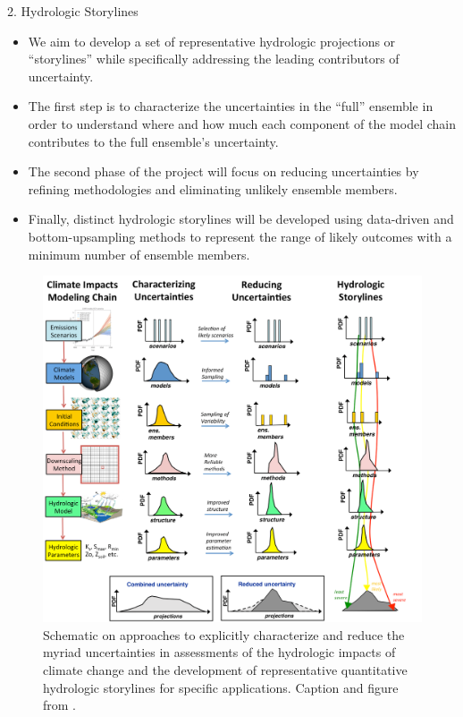 \documentclass{beamer}
\begin{document}
\begin{frame}{}
\begin{columns}
\begin{column}{.3333\paperwidth}
\begin{textblock}{\textwidth \TPHorizModule}
\begin{block}{2. Hydrologic Storylines}
\begin{itemize}
      \item We aim to develop a set of representative hydrologic projections or ``storylines'' while specifically addressing the leading contributors of uncertainty.
      \item The first step is to characterize the uncertainties in the ``full'' ensemble in order to understand where and how much each component of the model chain contributes to the full ensemble's uncertainty.
      \item The second phase of the project will focus on reducing uncertainties by refining methodologies and eliminating unlikely ensemble members.
      \item Finally, distinct hydrologic storylines will be developed using data-driven and bottom-upsampling methods to represent the range of likely outcomes with a minimum number of ensemble members.

     \end{itemize}

     \begin{figure}
      \center\includegraphics[width=\linewidth]{figures/storylines_diag.png}
      \caption{Schematic on approaches to explicitly characterize and reduce the myriad uncertainties in assessments of the hydrologic impacts of climate change and the development of representative quantitative hydrologic storylines for specific applications. Caption and figure from \citep{Clark_2016}.
       \label{fig:storylines}}
     \end{figure}


\end{block}
\end{textblock}
\end{column}
\end{columns}
\end{frame}
\end{document}
